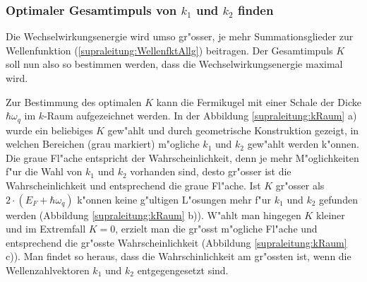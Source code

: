 \begin{refsection}
\subsubsection{Optimaler Gesamtimpuls von $k_1$ und $k_2$ finden}

Die Wechselwirkungsenergie wird umso gr"osser, je mehr Summationsglieder zur Wellenfunktion
(\ref{supraleitung:WellenfktAllg}) beitragen.
Der Gesamtimpuls $K$ soll nun also so bestimmen werden, dass die Wechselwirkungsenergie maximal wird.

Zur Bestimmung des optimalen $K$ kann die Fermikugel mit einer Schale der Dicke
$\hbar\omega_q$ im $k$-Raum aufgezeichnet werden.
In der Abbildung \ref{supraleitung:kRaum} a) wurde ein beliebiges $K$ gew"ahlt und durch
geometrische Konstruktion gezeigt, in welchen Bereichen (grau markiert) m"ogliche $k_1$ und $k_2$
gew"ahlt werden k"onnen.
Die graue Fl"ache entspricht der Wahrscheinlichkeit, denn je mehr M"oglichkeiten f"ur die Wahl
von $k_1$ und $k_2$ vorhanden sind, desto gr"osser ist die Wahrscheinlichkeit und entsprechend
die graue Fl"ache.
Ist $K$ gr"osser als $2\cdot(E_F+\hbar\omega_q)$ k"onnen keine g"ultigen L"osungen mehr
f"ur $k_1$ und $k_2$ gefunden werden (Abbildung \ref{supraleitung:kRaum} b)).
W"ahlt man hingegen $K$ kleiner und im Extremfall $K=0$, erzielt man die gr"osst m"ogliche
Fl"ache und entsprechend die gr"osste Wahrscheinlichkeit (Abbildung \ref{supraleitung:kRaum} c)).
Man findet so heraus, dass die Wahrschinlichkeit am gr"ossten ist, wenn die
Wellenzahlvektoren $k_1$ und $k_2$ entgegengesetzt sind.


\end{refsection}
